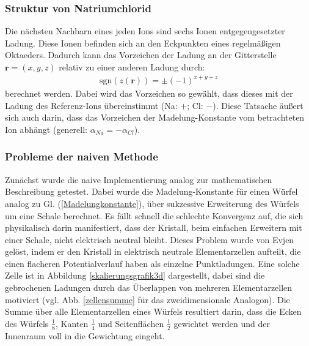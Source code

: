 \documentclass[10pt,a4paper]{article}
\begin{document}
\subsubsection{Struktur von Natriumchlorid}

Die nächsten Nachbarn eines jeden Ions sind sechs Ionen entgegengesetzter
Ladung. Diese Ionen befinden sich an den Eckpunkten eines regelmäßigen
Oktaeders. Dadurch kann das Vorzeichen der Ladung an der Gitterstelle
$\mathbf{r} = \left( x,y,z \right)$ relativ zu einer anderen Ladung durch:
\begin{align}
\mathrm{sgn}\left(z(\mathbf{r})\right) = \pm \left( -1 \right)^{x+y+z}
\label{eq:vorzeichen}
\end{align}
berechnet werden. Dabei wird das Vorzeichen so gewählt, dass dieses mit der Ladung
des Referenz-Ions übereinstimmt (Na: $+$; Cl: $-$). Diese Tatsache
äußert sich auch darin, dass das Vorzeichen der Madelung-Konstante vom
betrachteten Ion abhängt (generell: $\alpha_{Na} = - \alpha_{Cl}$).
\subsubsection{Probleme der naiven Methode}

Zunächst wurde die naive Implementierung analog zur mathematischen Beschreibung
getestet. Dabei wurde die Madelung-Konstante für einen Würfel analog zu
Gl. (\ref{Madelungkonstante}), über sukzessive Erweiterung des Würfels um eine
Schale berechnet. Es fällt schnell die schlechte Konvergenz auf, die sich
physikalisch darin manifestiert, dass der Kristall, beim einfachen Erweitern
mit einer Schale, nicht elektrisch neutral bleibt. Dieses Problem wurde von Evjen
\cite{Evjen} gelöst, indem er den Kristall in elektrisch neutrale Elementarzellen
aufteilt, die einen flacheren Potentialverlauf haben als einzelne Punktladungen.
Eine solche Zelle ist in Abbildung \ref{skalierungsgrafik3d} dargestellt,
dabei sind die gebrochenen Ladungen durch das Überlappen von mehreren Elementarzellen
motiviert (vgl. Abb. \ref{zellensumme} für das zweidimensionale Analogon). Die Summe über 
alle Elementarzellen eines Würfels resultiert darin, dass die Ecken des Würfels
$\frac{1}{8}$, Kanten $\frac{1}{4}$ und Seitenflächen $\frac{1}{2}$ gewichtet werden
und der Innenraum voll in die Gewichtung eingeht.
\end{document}
